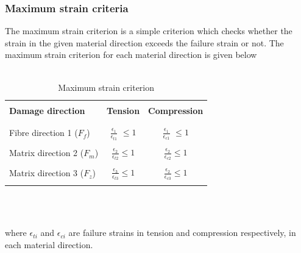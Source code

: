 \documentclass[a4paper,12pt]{extarticle}
\begin{document}
\subsubsection{Maximum strain criteria}
\indent\indent\indent The maximum strain criterion is a simple criterion which checks whether the strain in the given material direction exceeds the failure strain or not. The maximum strain criterion for each material direction is given below
\\
\\
\begin{table}[h!]
  \begin{center}
     \begin{tabular}{l  c  c} 
     \hline
     \\
      \textbf{Damage direction} \;\;& \textbf{Tension} \;& \textbf{Compression}\\
      \\
      \hline
      \\
      Fibre direction 1 ($F_{f}$) & \Large{$\frac{\epsilon_{1}}{\epsilon_{t1}} $}\small{ $\leq 1$} &  \Large{$\frac{\epsilon_{1}}{\epsilon_{c1}} $}\small{ $\leq 1$}\\
      \\
      Matrix direction 2 ($F_{m}$)  &  \Large{$\frac{\epsilon_{2}}{\epsilon_{t2}} $}\small{$\leq 1$}  & \Large{$\frac{\epsilon_{2}}{\epsilon_{c2}} $}\small{$\leq 1$}\\
      \\
      Matrix direction 3 ($F_{z}$) &  \Large{$\frac{\epsilon_{3}}{\epsilon_{t3}} $}\small{$\leq 1$}  &   \Large{$\frac{\epsilon_{2}}{\epsilon_{c3}} $}\small{$\leq 1$}\\
       \\
       \hline
    \end{tabular}
    \\
    \caption{Maximum strain criterion}
    \label{tab:Maximum strain criterion}
  \end{center}
\end{table}\\
where $\epsilon_{ti}$ and $\epsilon_{ci}$ are failure strains in tension and compression respectively, in each material direction. 
\\
\end{document}
